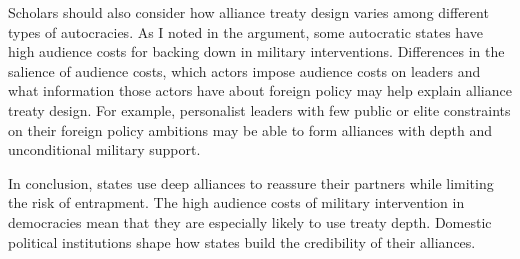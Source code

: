 \documentclass[12pt]{article}
\begin{document}
Scholars should also consider how alliance treaty design varies among different types of autocracies. 
As I noted in the argument, some autocratic states have high audience costs for backing down in military interventions. 
Differences in the salience of audience costs, which actors impose audience costs on leaders and what information those actors have about foreign policy \citep{Weeks2008} may help explain alliance treaty design.
For example, personalist leaders with few public or elite constraints on their foreign policy ambitions may be able to form alliances with depth and unconditional military support. 


In conclusion, states use deep alliances to reassure their partners while limiting the risk of entrapment. 
The high audience costs of military intervention in democracies mean that they are especially likely to use treaty depth. 
Domestic political institutions shape how states build the credibility of their alliances.



\singlespace
 
 
\end{document}
